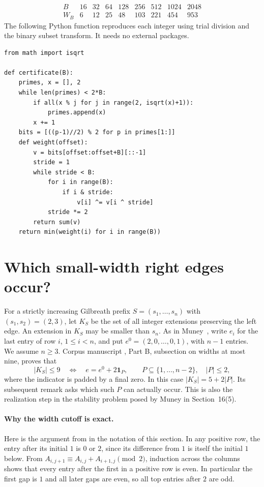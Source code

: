 \documentclass[11pt,a4paper]{article}
\begin{document}
\[
\begin{array}{c|rrrrrrrr}
B&16&32&64&128&256&512&1024&2048\\\hline
W_B&6&12&25&48&103&221&454&953
\end{array}
\]
The following Python function reproduces each integer using trial division and the binary subset transform. It needs no external packages.
\begin{verbatim}
from math import isqrt

def certificate(B):
    primes, x = [], 2
    while len(primes) < 2*B:
        if all(x % j for j in range(2, isqrt(x)+1)):
            primes.append(x)
        x += 1
    bits = [((p-1)//2) % 2 for p in primes[1:]]
    def weight(offset):
        v = bits[offset:offset+B][::-1]
        stride = 1
        while stride < B:
            for i in range(B):
                if i & stride:
                    v[i] ^= v[i ^ stride]
            stride *= 2
        return sum(v)
    return min(weight(i) for i in range(B))
\end{verbatim}

\section{Which small-width right edges occur?}
\label{sec:reach}
For a strictly increasing Gilbreath prefix $S=(s_1,\ldots,s_n)$ with $(s_1,s_2)=(2,3)$, let $K_S$ be the set of all integer extensions preserving the left edge. An extension in $K_S$ may be smaller than $s_n$. As in Muney~\cite{muney}, write $e_i$ for the last entry of row $i$, $1\le i<n$, and put $e^0=(2,0,\ldots,0,1)$, with $n-1$ entries. We assume $n\ge3$. Corpus manuscript \cite{vmwidth}, Part B, subsection on widths at most nine, proves that
\[
 |K_S|\le9\quad\Longleftrightarrow\quad
 e=e^0+2\mathbf 1_P,\qquad P\subseteq\{1,\ldots,n-2\},\quad |P|\le2,
\]
where the indicator is padded by a final zero. In this case $|K_S|=5+2|P|$. Its subsequent remark asks which such $P$ can actually occur. This is also the realization step in the stability problem posed by Muney in Section~16(5).


\paragraph{Why the width cutoff is exact.}
Here is the argument from \cite{muney,vmwidth} in the notation of this section. In any positive row, the entry after its initial $1$ is $0$ or $2$, since its difference from $1$ is itself the initial $1$ below. From $A_{i,j+1}\equiv A_{i,j}+A_{i+1,j}\pmod2$, induction across the columns shows that every entry after the first in a positive row is even. In particular the first gap is $1$ and all later gaps are even, so all top entries after $2$ are odd.
\end{document}
